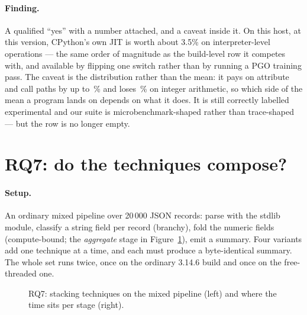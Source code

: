 \paragraph{Finding.} A qualified ``yes'' with a number attached, and a caveat inside it. On this
host, at this version, CPython's own JIT is worth about 3.5\% on interpreter-level operations
--- the same order of magnitude as the build-level row it competes with, and available by
flipping one  switch rather than by running a PGO training pass. The caveat is
the distribution rather than the mean: it pays on attribute and call paths by up to \,\% and
loses \,\% on integer arithmetic, so which side of the mean a program lands on depends on what
it does. It is still correctly labelled experimental and our suite is microbenchmark-shaped rather than
trace-shaped --- but the row is no longer empty.

\section{RQ7: do the techniques compose?}
\label{sec:rq7}


\paragraph{Setup.} An ordinary mixed pipeline over 20\,000 JSON records: parse with the
stdlib  module, classify a string field per record (branchy), fold the numeric
fields (compute-bound; the \emph{aggregate} stage in Figure~\ref{fig:pipeline}), emit a summary. Four variants add one technique at a time, and each
must produce a byte-identical summary. The whole set runs twice, once on the ordinary 3.14.6
build and once on the free-threaded one.

\begin{figure}[t]
  \centering
  \caption{RQ7: stacking techniques on the mixed pipeline (left) and where the time sits
    per stage (right).}
  \label{fig:pipeline}
\end{figure}

